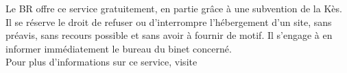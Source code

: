 Le BR offre ce service gratuitement, en partie grâce à une subvention de la Kès.
Il se réserve le droit de refuser ou d'interrompre l'hébergement d'un site, sans préavis, sans recours possible et sans avoir à fournir de motif.
Il s'engage à en informer immédiatement le bureau du binet concerné.\\
Pour plus d'informations sur ce service, visite 
